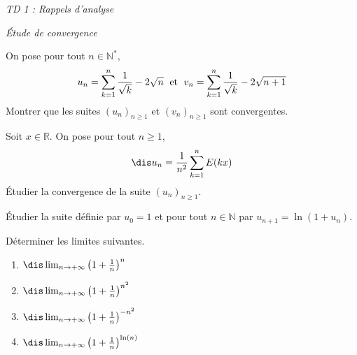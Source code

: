 \documentclass[a4paper,10pt]{report}
\begin{document}
\everymath{\displaystyle}


\begin{center}
\textit{{ {\huge TD 1 : Rappels d'analyse}}}
\end{center}
\bigskip


\begin{center}
\textit{{ {\large Étude de convergence}}}
\end{center}



\setlength{\shadowsize}{2pt} 



\begin{Exa}
On pose pour tout $n \in \mathbb{N}^*$, 
    \[
    u_n = \sum_{k = 1}^n {\frac{1}{\sqrt k}} - 2\sqrt n \; \hbox{ et } \; v_n = \sum_{k = 1}^n {\frac{1}{\sqrt k}} - 2\sqrt {n + 1}
    \]
 Montrer que les suites $(u_n)_{n \geq 1}$ et $(v_n)_{n \geq 1}$ sont convergentes.
 \end{Exa}
 
 
 
\begin{Exa} Soit $x \in \mathbb{R}$. On pose pour tout $n \geq 1$, 
$$\dis u_n = \frac{1}{n^2} \sum_{k=1}^n E(kx)$$
Étudier la convergence de la suite $(u_n)_{n \geq 1}$.
\end{Exa}



\begin{Exa} Étudier la suite définie par $u_0=1$ et pour tout $n \in \mathbb{N}$ par $u_{n+1}=\ln(1+u_n)$.
\end{Exa} 


\begin{Exa} Déterminer les limites suivantes. 

\begin{multicols}{2}
\begin{enumerate}
\item $\dis \lim_{n \rightarrow + \infty} \left(1+ \frac{1}{n}\right)^n$
\item $\dis \lim_{n \rightarrow + \infty} \left(1+ \frac{1}{n}\right)^{n^2}$
\columnbreak
\item $\dis \lim_{n \rightarrow + \infty} \left(1+ \frac{1}{n}\right)^{-n^2}$
\item $\dis \lim_{n \rightarrow + \infty} \left(1+ \frac{1}{n}\right)^{\ln(n)}$
\end{enumerate}
\end{multicols}
\vspace{0.1cm}
\end{Exa} 
\end{document}
